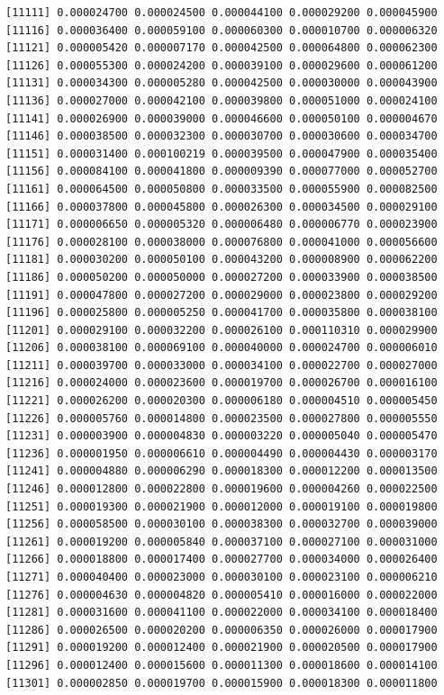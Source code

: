 \documentclass[]{article}
\begin{document}
\begin{verbatim}
[11111] 0.000024700 0.000024500 0.000044100 0.000029200 0.000045900
[11116] 0.000036400 0.000059100 0.000060300 0.000010700 0.000006320
[11121] 0.000005420 0.000007170 0.000042500 0.000064800 0.000062300
[11126] 0.000055300 0.000024200 0.000039100 0.000029600 0.000061200
[11131] 0.000034300 0.000005280 0.000042500 0.000030000 0.000043900
[11136] 0.000027000 0.000042100 0.000039800 0.000051000 0.000024100
[11141] 0.000026900 0.000039000 0.000046600 0.000050100 0.000004670
[11146] 0.000038500 0.000032300 0.000030700 0.000030600 0.000034700
[11151] 0.000031400 0.000100219 0.000039500 0.000047900 0.000035400
[11156] 0.000084100 0.000041800 0.000009390 0.000077000 0.000052700
[11161] 0.000064500 0.000050800 0.000033500 0.000055900 0.000082500
[11166] 0.000037800 0.000045800 0.000026300 0.000034500 0.000029100
[11171] 0.000006650 0.000005320 0.000006480 0.000006770 0.000023900
[11176] 0.000028100 0.000038000 0.000076800 0.000041000 0.000056600
[11181] 0.000030200 0.000050100 0.000043200 0.000008900 0.000062200
[11186] 0.000050200 0.000050000 0.000027200 0.000033900 0.000038500
[11191] 0.000047800 0.000027200 0.000029000 0.000023800 0.000029200
[11196] 0.000025800 0.000005250 0.000041700 0.000035800 0.000038100
[11201] 0.000029100 0.000032200 0.000026100 0.000110310 0.000029900
[11206] 0.000038100 0.000069100 0.000040000 0.000024700 0.000006010
[11211] 0.000039700 0.000033000 0.000034100 0.000022700 0.000027000
[11216] 0.000024000 0.000023600 0.000019700 0.000026700 0.000016100
[11221] 0.000026200 0.000020300 0.000006180 0.000004510 0.000005450
[11226] 0.000005760 0.000014800 0.000023500 0.000027800 0.000005550
[11231] 0.000003900 0.000004830 0.000003220 0.000005040 0.000005470
[11236] 0.000001950 0.000006610 0.000004490 0.000004430 0.000003170
[11241] 0.000004880 0.000006290 0.000018300 0.000012200 0.000013500
[11246] 0.000012800 0.000022800 0.000019600 0.000004260 0.000022500
[11251] 0.000019300 0.000021900 0.000012000 0.000019100 0.000019800
[11256] 0.000058500 0.000030100 0.000038300 0.000032700 0.000039000
[11261] 0.000019200 0.000005840 0.000037100 0.000027100 0.000031000
[11266] 0.000018800 0.000017400 0.000027700 0.000034000 0.000026400
[11271] 0.000040400 0.000023000 0.000030100 0.000023100 0.000006210
[11276] 0.000004630 0.000004820 0.000005410 0.000016000 0.000022000
[11281] 0.000031600 0.000041100 0.000022000 0.000034100 0.000018400
[11286] 0.000026500 0.000020200 0.000006350 0.000026000 0.000017900
[11291] 0.000019200 0.000012400 0.000021900 0.000020500 0.000017900
[11296] 0.000012400 0.000015600 0.000011300 0.000018600 0.000014100
[11301] 0.000002850 0.000019700 0.000015900 0.000018300 0.000011800

\end{verbatim}
\end{document}
